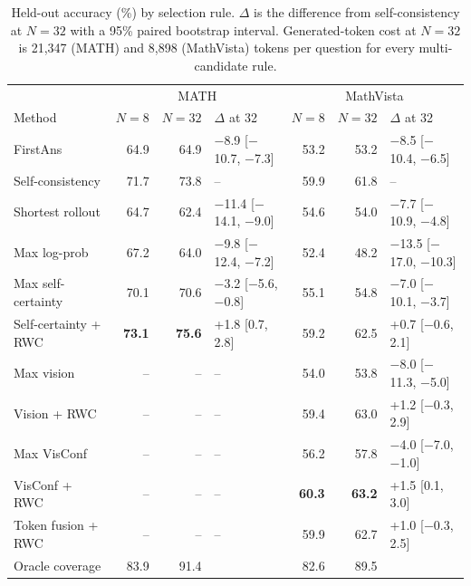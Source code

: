 \documentclass{article}
\begin{document}
\begin{table}[t]
\caption{Held-out accuracy (\%) by selection rule. $\Delta$ is the difference from self-consistency at $N{=}32$ with a
95\% paired bootstrap interval. Generated-token cost at $N{=}32$ is 21,347 (MATH) and 8,898 (MathVista) tokens per
question for every multi-candidate rule.}
\label{tab:t3methods}
\centering
\footnotesize
\begin{tabular}{lrrlrrl}
\toprule
 & \multicolumn{3}{c}{MATH} & \multicolumn{3}{c}{MathVista} \\
Method & $N{=}8$ & $N{=}32$ & $\Delta$ at 32 & $N{=}8$ & $N{=}32$ & $\Delta$ at 32 \\
\midrule
FirstAns & 64.9 & 64.9 & $-$8.9 [$-$10.7, $-$7.3] & 53.2 & 53.2 & $-$8.5 [$-$10.4, $-$6.5] \\
Self-consistency & 71.7 & 73.8 & -- & 59.9 & 61.8 & -- \\
Shortest rollout & 64.7 & 62.4 & $-$11.4 [$-$14.1, $-$9.0] & 54.6 & 54.0 & $-$7.7 [$-$10.9, $-$4.8] \\
Max log-prob & 67.2 & 64.0 & $-$9.8 [$-$12.4, $-$7.2] & 52.4 & 48.2 & $-$13.5 [$-$17.0, $-$10.3] \\
Max self-certainty & 70.1 & 70.6 & $-$3.2 [$-$5.6, $-$0.8] & 55.1 & 54.8 & $-$7.0 [$-$10.1, $-$3.7] \\
Self-certainty + RWC & \textbf{73.1} & \textbf{75.6} & +1.8 [0.7, 2.8] & 59.2 & 62.5 & +0.7 [$-$0.6, 2.1] \\
Max vision & -- & -- & -- & 54.0 & 53.8 & $-$8.0 [$-$11.3, $-$5.0] \\
Vision + RWC & -- & -- & -- & 59.4 & 63.0 & +1.2 [$-$0.3, 2.9] \\
Max VisConf & -- & -- & -- & 56.2 & 57.8 & $-$4.0 [$-$7.0, $-$1.0] \\
VisConf + RWC & -- & -- & -- & \textbf{60.3} & \textbf{63.2} & +1.5 [0.1, 3.0] \\
Token fusion + RWC & -- & -- & -- & 59.9 & 62.7 & +1.0 [$-$0.3, 2.5] \\
\midrule
Oracle coverage & 83.9 & 91.4 & & 82.6 & 89.5 & \\
\bottomrule
\end{tabular}
\end{table}
\end{document}
